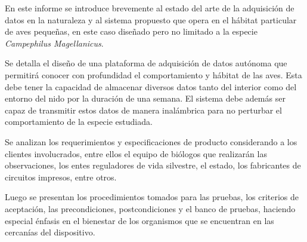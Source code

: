 %

%

En este informe se introduce brevemente al estado del arte de la adquisición de datos en la naturaleza y al sistema propuesto que opera en el hábitat particular de aves pequeñas, en este caso diseñado pero no limitado a la especie \textit{Campephilus Magellanicus}. 

Se detalla el diseño de una plataforma de adquisición de datos autónoma que permitirá conocer con profundidad el comportamiento y hábitat de las aves. Esta debe tener la capacidad de almacenar diversos datos tanto del interior como del entorno del nido por la duración de una semana. El sistema debe además ser capaz de transmitir estos datos de manera inalámbrica para no perturbar el comportamiento de la especie estudiada.

Se analizan los requerimientos y especificaciones de producto considerando a los clientes involucrados, entre ellos el equipo de biólogos que realizarán las observaciones, los entes reguladores de vida silvestre, el estado, los fabricantes de circuitos impresos, entre otros.

Luego se presentan los procedimientos tomados para las pruebas, los criterios de aceptación, las precondiciones, postcondiciones y el banco de pruebas, haciendo especial énfasis en el bienestar de los organismos que se encuentran en las cercanías del dispositivo.\\
\TBC
%
